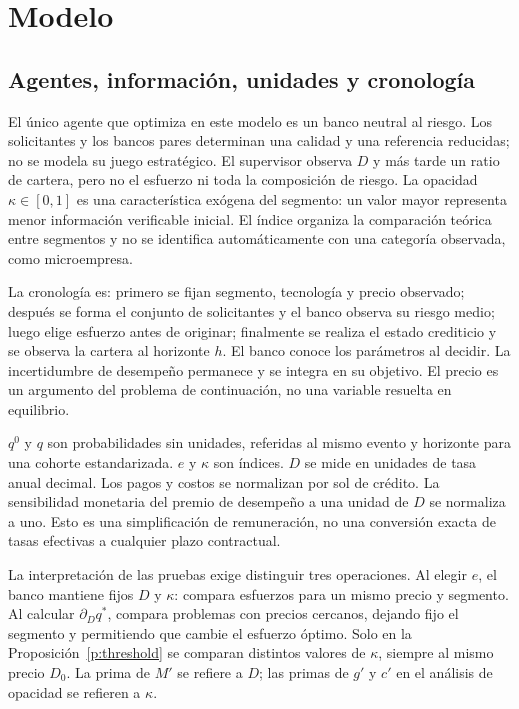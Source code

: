\documentclass[11pt]{article}
\theoremstyle{definition}\newtheorem{assumption}{Supuesto}
\begin{document}
\section{Modelo}\label{sec:model}
\subsection{Agentes, información, unidades y cronología}
El único agente que optimiza en este modelo es un banco neutral al riesgo.
Los solicitantes y los bancos pares determinan una calidad y una referencia
reducidas; no se modela su juego estratégico. El supervisor observa $D$ y más
tarde un ratio de cartera, pero no el esfuerzo ni toda la composición de riesgo.
La opacidad $\kappa\in[0,1]$ es una característica exógena del segmento: un
valor mayor representa menor información verificable inicial. El índice organiza la comparación teórica entre segmentos y no se identifica
automáticamente con una categoría observada, como microempresa.

La cronología es: primero se fijan segmento, tecnología y precio observado;
después se forma el conjunto de solicitantes y el banco observa su riesgo
medio; luego elige esfuerzo antes de originar; finalmente se realiza el
estado crediticio y se observa la cartera al horizonte $h$. El banco conoce
los parámetros al decidir. La incertidumbre de desempeño permanece y se
integra en su objetivo. El precio es un argumento del problema de continuación,
no una variable resuelta en equilibrio.

$q^0$ y $q$ son probabilidades sin unidades, referidas al mismo evento y
horizonte para una cohorte estandarizada. $e$ y $\kappa$ son índices. $D$ se
mide en unidades de tasa anual decimal. Los pagos y costos se normalizan por
sol de crédito. La sensibilidad monetaria del premio de desempeño a una unidad
de $D$ se normaliza a uno. Esto es una simplificación de remuneración, no una
conversión exacta de tasas efectivas a cualquier plazo contractual.

La interpretación de las pruebas exige distinguir tres operaciones. Al elegir
$e$, el banco mantiene fijos $D$ y $\kappa$: compara esfuerzos para un mismo
precio y segmento. Al calcular $\partial_Dq^*$, compara problemas con precios
cercanos, dejando fijo el segmento y permitiendo que cambie el esfuerzo
óptimo. Solo en la Proposición~\ref{p:threshold} se comparan distintos valores
de $\kappa$, siempre al mismo precio $D_0$. La prima de $M'$ se refiere a $D$;
las primas de $g'$ y $c'$ en el análisis de opacidad se refieren a $\kappa$.
\end{document}

